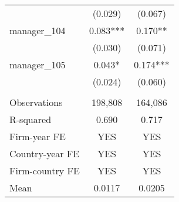 \begin{tabular}{lcc}
 & (0.029) & (0.067) \\
manager\_104 & 0.083*** & 0.170** \\
 & (0.030) & (0.071) \\
manager\_105 & 0.043* & 0.174*** \\
 & (0.024) & (0.060) \\
 &  &  \\
Observations & 198,808 & 164,086 \\
R-squared & 0.690 & 0.717 \\
Firm-year FE & YES & YES \\
Country-year FE & YES & YES \\
Firm-country FE & YES & YES \\
 Mean & 0.0117 & 0.0205 \\ \hline
\end{tabular}
